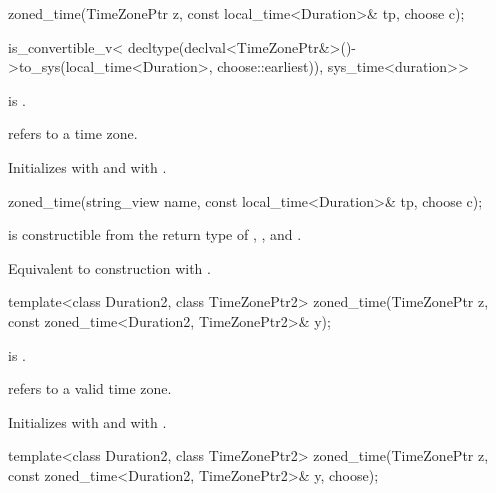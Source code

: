 \begin{itemdecl}
zoned_time(TimeZonePtr z, const local_time<Duration>& tp, choose c);
\end{itemdecl}

\begin{itemdescr}
\pnum
\constraints
\begin{codeblock}
is_convertible_v<
  decltype(declval<TimeZonePtr&>()->to_sys(local_time<Duration>{}, choose::earliest)),
  sys_time<duration>>
\end{codeblock}
is .

\pnum
\expects
{} refers to a time zone.

\pnum
\effects
Initializes  with  and  with .
\end{itemdescr}

\begin{itemdecl}
zoned_time(string_view name, const local_time<Duration>& tp, choose c);
\end{itemdecl}

\begin{itemdescr}
\pnum
\constraints
{} is constructible from
the return type of , , and .

\pnum
\effects
Equivalent to construction with .
\end{itemdescr}

\begin{itemdecl}
template<class Duration2, class TimeZonePtr2>
  zoned_time(TimeZonePtr z, const zoned_time<Duration2, TimeZonePtr2>& y);
\end{itemdecl}

\begin{itemdescr}
\pnum
\constraints
{} is .

\pnum
\expects
{} refers to a valid time zone.

\pnum
\effects
Initializes  with  and  with .
\end{itemdescr}

\begin{itemdecl}
template<class Duration2, class TimeZonePtr2>
  zoned_time(TimeZonePtr z, const zoned_time<Duration2, TimeZonePtr2>& y, choose);
\end{itemdecl}

